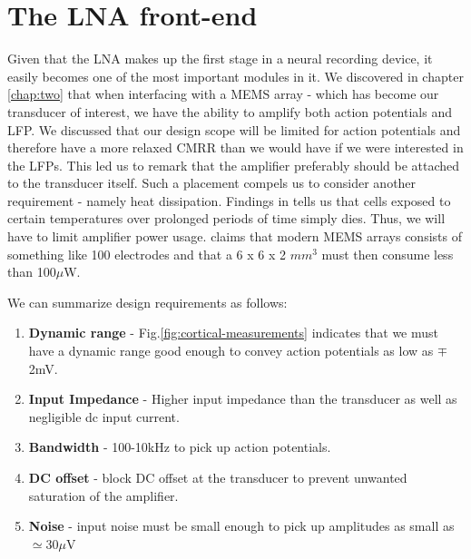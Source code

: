 \chapter{The LNA front-end}
Given that the \acl{LNA} makes up the first stage in a neural recording device, it easily becomes one of the most important modules in it.  We discovered in chapter \ref{chap:two} that when interfacing with a \acs{MEMS} array - which has become our transducer of interest, we have the ability to amplify both action potentials and \acs{LFP}. We discussed that our design scope will be limited for action potentials and therefore have a more relaxed CMRR than we would have if we were interested in the LFPs. This led us to remark that the amplifier preferably should be attached to the transducer itself. Such a placement compels us to consider another requirement - namely heat dissipation. Findings in  \cite{seese1998characterization} tells us that cells exposed to certain temperatures over prolonged periods of time simply dies. Thus, we will have to limit amplifier power usage.  \cite{harrison2008design} claims that modern \acs{MEMS} arrays consists of something like 100 electrodes and that a 6 x 6 x 2 $mm^3$ must then consume less than 100$\mu$W. 

We can summarize design requirements as follows:

\begin{enumerate}
  \item\textbf{Dynamic range} - Fig.\ref{fig:cortical-measurements} indicates that we must have a dynamic range good enough to convey action potentials as low as $\mp$2mV.
  \item\textbf{Input Impedance} - Higher input impedance than the transducer as well as negligible dc input current.
  \item\textbf{Bandwidth} - 100-10kHz to pick up action potentials.
  \item\textbf{DC offset} - block DC offset at the transducer to prevent unwanted saturation of the amplifier.
  \item\textbf{Noise} - input noise must be small enough to pick up amplitudes as small as $\simeq$30$\mu$V
\end{enumerate}
